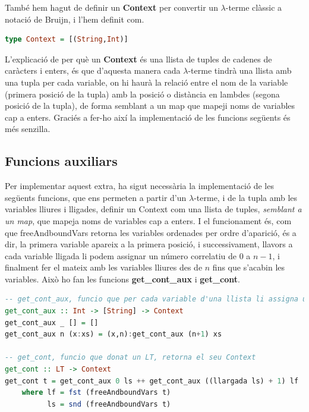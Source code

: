 \documentclass[10pt,a4paper]{article}
\begin{document}
També hem hagut de definir un \textbf{Context} per convertir un $\lambda$-terme clàssic a notació de Bruijn, i l'hem definit com.

\begin{lstlisting}[language=Haskell]
type Context = [(String,Int)]
\end{lstlisting}

L'explicació de per què un \textbf{Context} és una llista de tuples de cadenes de caràcters i enters, és que d'aquesta manera cada $\lambda$-terme tindrà una llista amb una tupla per cada variable, on hi haurà la relació entre el nom de la variable (primera posició de la tupla) amb la posició o distància en lambdes (segona posició de la tupla), de forma semblant a un map que mapeji noms de variables cap a enters. Graciés a fer-ho així la implementació de les funcions següents és més senzilla.

\clearpage

\subsection{Funcions auxiliars}

Per implementar aquest extra, ha sigut necessària la implementació de les següents funcions, que ens permeten a partir d'un $\lambda$-terme, i de la tupla amb les variables lliures i lligades, definir un Context com una llista de tuples, \textit{semblant a un map}, que mapeja noms de variables cap a enters. I el funcionament és, com que freeAndboundVars retorna les variables ordenades per ordre d'aparició, és a dir, la primera variable apareix a la primera posició, i successivament, llavors a cada variable lligada li podem assignar un número correlatiu de $0$ a $n-1$, i finalment fer el mateix amb les variables lliures des de $n$ fins que s'acabin les variables. Això ho fan les funcions \textbf{get\_cont\_aux} i \textbf{get\_cont}.

\begin{lstlisting}[language=Haskell]
-- get_cont_aux, funcio que per cada variable d'una llista li assigna un numero correlatiu de 0 a n
get_cont_aux :: Int -> [String] -> Context
get_cont_aux _ [] = []
get_cont_aux n (x:xs) = (x,n):get_cont_aux (n+1) xs

-- get_cont, funcio que donat un LT, retorna el seu Context
get_cont :: LT -> Context
get_cont t = get_cont_aux 0 ls ++ get_cont_aux ((llargada ls) + 1) lf
    where lf = fst (freeAndboundVars t)
          ls = snd (freeAndboundVars t)
\end{lstlisting}
\end{document}
